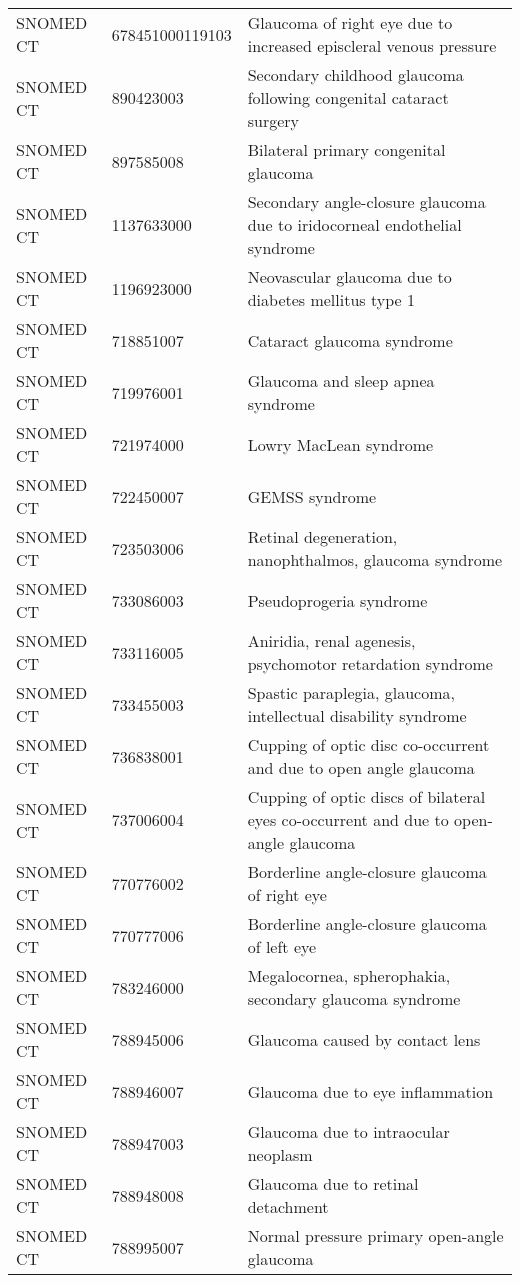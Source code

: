 \begin{longtable}{p{}p{}p{}}
  SNOMED CT & 678451000119103 & Glaucoma of right eye due to increased episcleral venous pressure \\ 
  SNOMED CT & 890423003 & Secondary childhood glaucoma following congenital cataract surgery \\ 
  SNOMED CT & 897585008 & Bilateral primary congenital glaucoma \\ 
  SNOMED CT & 1137633000 & Secondary angle-closure glaucoma due to iridocorneal endothelial syndrome \\ 
  SNOMED CT & 1196923000 & Neovascular glaucoma due to diabetes mellitus type 1 \\ 
  SNOMED CT & 718851007 & Cataract glaucoma syndrome \\ 
  SNOMED CT & 719976001 & Glaucoma and sleep apnea syndrome \\ 
  SNOMED CT & 721974000 & Lowry MacLean syndrome \\ 
  SNOMED CT & 722450007 & GEMSS syndrome \\ 
  SNOMED CT & 723503006 & Retinal degeneration, nanophthalmos, glaucoma syndrome \\ 
  SNOMED CT & 733086003 & Pseudoprogeria syndrome \\ 
  SNOMED CT & 733116005 & Aniridia, renal agenesis, psychomotor retardation syndrome \\ 
  SNOMED CT & 733455003 & Spastic paraplegia, glaucoma, intellectual disability syndrome \\ 
  SNOMED CT & 736838001 & Cupping of optic disc co-occurrent and due to open angle glaucoma \\ 
  SNOMED CT & 737006004 & Cupping of optic discs of bilateral eyes co-occurrent and due to open-angle glaucoma \\ 
  SNOMED CT & 770776002 & Borderline angle-closure glaucoma of right eye \\ 
  SNOMED CT & 770777006 & Borderline angle-closure glaucoma of left eye \\ 
  SNOMED CT & 783246000 & Megalocornea, spherophakia, secondary glaucoma syndrome \\ 
  SNOMED CT & 788945006 & Glaucoma caused by contact lens \\ 
  SNOMED CT & 788946007 & Glaucoma due to eye inflammation \\ 
  SNOMED CT & 788947003 & Glaucoma due to intraocular neoplasm \\ 
  SNOMED CT & 788948008 & Glaucoma due to retinal detachment \\ 
  SNOMED CT & 788995007 & Normal pressure primary open-angle glaucoma \\ 

\end{longtable}
